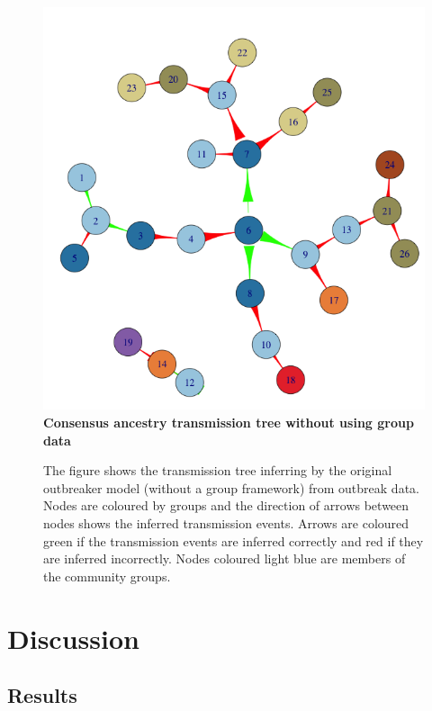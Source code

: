 \documentclass[11pt,a4paper]{report}
\begin{document}
\begin{figure}[h!]
\centering
\includegraphics[scale=0.5]{tree_no_grps.png} \newline
{\bf Consensus ancestry transmission tree without using group data}
\caption{The figure shows the transmission tree inferring by the original outbreaker model (without a group framework) from outbreak data. Nodes are coloured by groups and the direction of arrows between nodes shows the inferred transmission events. Arrows are coloured green if the transmission events are inferred correctly and red if they are inferred incorrectly. Nodes coloured light blue are members of the community groups.}
\end{figure}



\chapter{Discussion}
\section{Results}
\end{document}
